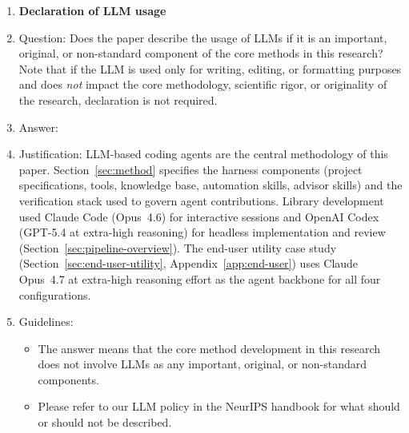\begin{enumerate}
\item {\bf Declaration of LLM usage}
    \item[] Question: Does the paper describe the usage of LLMs if it is an important, original, or non-standard component of the core methods in this research? Note that if the LLM is used only for writing, editing, or formatting purposes and does \emph{not} impact the core methodology, scientific rigor, or originality of the research, declaration is not required.
    \item[] Answer: \answerYes{}
    \item[] Justification: LLM-based coding agents are the central methodology of this paper. Section~\ref{sec:method} specifies the harness components (project specifications, tools, knowledge base, automation skills, advisor skills) and the verification stack used to govern agent contributions. Library development used Claude Code (Opus~4.6) for interactive sessions and OpenAI Codex (GPT-5.4 at extra-high reasoning) for headless implementation and review (Section~\ref{sec:pipeline-overview}). The end-user utility case study (Section~\ref{sec:end-user-utility}, Appendix~\ref{app:end-user}) uses Claude Opus~4.7 at extra-high reasoning effort as the agent backbone for all four configurations.
    \item[] Guidelines:
    \begin{itemize}
        \item The answer \answerNA{} means that the core method development in this research does not involve LLMs as any important, original, or non-standard components.
        \item Please refer to our LLM policy in the NeurIPS handbook for what should or should not be described.
    \end{itemize}

\end{enumerate}
